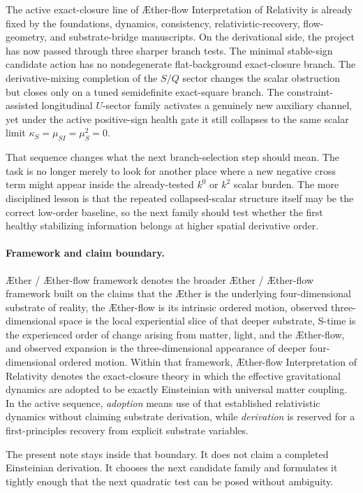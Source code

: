 \documentclass[11pt]{article}
\newcommand{\Aether}{\AE{}ther}
\newcommand{\Aflow}{\AE{}ther-flow}
\newcommand{\TheoryName}{\Aflow{} Interpretation of Relativity}
\newcommand{\TheoryProgram}{\Aether{} / \Aflow{} framework}
\begin{document}
The active exact-closure line of \TheoryName{} is already fixed by the foundations, dynamics, consistency, relativistic-recovery, flow-geometry, and substrate-bridge manuscripts. On the derivational side, the project has now passed through three sharper branch tests. The minimal stable-sign candidate action has no nondegenerate flat-background exact-closure branch. The derivative-mixing completion of the \(S/Q\) sector changes the scalar obstruction but closes only on a tuned semidefinite exact-square branch. The constraint-assisted longitudinal \(U\)-sector family activates a genuinely new auxiliary channel, yet under the active positive-sign health gate it still collapses to the same scalar limit \(\kappa_S=\mu_{SI}=\mu_S^2=0\).

That sequence changes what the next branch-selection step should mean. The task is no longer merely to look for another place where a new negative cross term might appear inside the already-tested \(k^0\) or \(k^2\) scalar burden. The more disciplined lesson is that the repeated collapsed-scalar structure itself may be the correct low-order baseline, so the next family should test whether the first healthy stabilizing information belongs at higher spatial derivative order.

\paragraph{Framework and claim boundary.}
\TheoryProgram{} denotes the broader \Aether{} / \Aflow{} framework built on the claims that the \Aether{} is the underlying four-dimensional substrate of reality, the \Aflow{} is its intrinsic ordered motion, observed three-dimensional space is the local experiential slice of that deeper substrate, S-time is the experienced order of change arising from matter, light, and the \Aflow{}, and observed expansion is the three-dimensional appearance of deeper four-dimensional ordered motion. Within that framework, \TheoryName{} denotes the exact-closure theory in which the effective gravitational dynamics are adopted to be exactly Einsteinian with universal matter coupling. In the active sequence, \emph{adoption} means use of that established relativistic dynamics without claiming substrate derivation, while \emph{derivation} is reserved for a first-principles recovery from explicit substrate variables.

The present note stays inside that boundary. It does not claim a completed Einsteinian derivation. It chooses the next candidate family and formulates it tightly enough that the next quadratic test can be posed without ambiguity.
\end{document}
